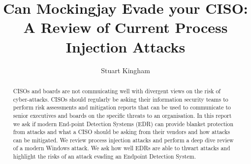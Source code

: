 \documentclass{article}
\title{Can Mockingjay Evade your CISO: A Review of Current Process Injection Attacks}
\author{Stuart Kingham}
\begin{document}
\maketitle

\begin{abstract}
  CISOs and boards are not commuicating well with divergent views on the risk of cyber-attacks.
  CISOs should regularly be asking their information security teams to perform risk assessments and mitigation reports that can be used to
  communicate to senior executives and boards on the specific threats to an organisation. 
  In this report we ask if modern End-point Detection Systems (EDR) can provide blanket protection from attacks and what a CISO should be asking from
  their vendors and how attacks can be mitigated.  We review process injection attacks and perform a deep dive review of a modern Windows attack.  We
  ask how well EDRs are able to thwart attacks and highlight the risks of an attack evading an Endpoint Detection System.
\end{abstract}

\tableofcontents





\pagebreak





\printbibliography

\appendix


\end{document}
